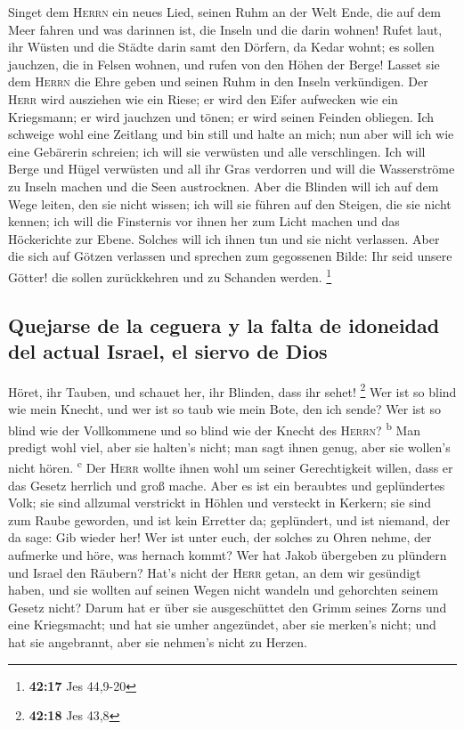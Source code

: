  Singet dem \textsc{Herrn} ein neues Lied, seinen Ruhm an
der Welt Ende, die auf dem Meer fahren und was darinnen ist, die Inseln
und die darin wohnen!  Rufet laut, ihr Wüsten und die
Städte darin samt den Dörfern, da Kedar wohnt; es sollen jauchzen, die
in Felsen wohnen, und rufen von den Höhen der Berge! 
Lasset sie dem \textsc{Herrn} die Ehre geben und seinen Ruhm in den
Inseln verkündigen.  Der \textsc{Herr} wird ausziehen wie
ein Riese; er wird den Eifer aufwecken wie ein Kriegsmann; er wird
jauchzen und tönen; er wird seinen Feinden obliegen.  Ich
schweige wohl eine Zeitlang und bin still und halte an mich; nun aber
will ich wie eine Gebärerin schreien; ich will sie verwüsten und alle
verschlingen.  Ich will Berge und Hügel verwüsten und all
ihr Gras verdorren und will die Wasserströme zu Inseln machen und die
Seen austrocknen.  Aber die Blinden will ich auf dem Wege
leiten, den sie nicht wissen; ich will sie führen auf den Steigen, die
sie nicht kennen; ich will die Finsternis vor ihnen her zum Licht machen
und das Höckerichte zur Ebene. Solches will ich ihnen tun und sie nicht
verlassen.  Aber die sich auf Götzen verlassen und
sprechen zum gegossenen Bilde: Ihr seid unsere Götter! die sollen
zurückkehren und zu Schanden werden. \footnote{\textbf{42:17} Jes
  44,9-20}

\hypertarget{quejarse-de-la-ceguera-y-la-falta-de-idoneidad-del-actual-israel-el-siervo-de-dios}{%
\subsection{Quejarse de la ceguera y la falta de idoneidad del actual
Israel, el siervo de
Dios}\label{quejarse-de-la-ceguera-y-la-falta-de-idoneidad-del-actual-israel-el-siervo-de-dios}}

 Höret, ihr Tauben, und schauet her, ihr Blinden, dass
ihr sehet! \footnote{\textbf{42:18} Jes 43,8}  Wer ist so
blind wie mein Knecht, und wer ist so taub wie mein Bote, den ich sende?
Wer ist so blind wie der Vollkommene und so blind wie der Knecht des
\textsc{Herrn}? \textsuperscript{b}  Man predigt wohl
viel, aber sie halten's nicht; man sagt ihnen genug, aber sie wollen's
nicht hören. \textsuperscript{c}  Der \textsc{Herr}
wollte ihnen wohl um seiner Gerechtigkeit willen, dass er das Gesetz
herrlich und groß mache.  Aber es ist ein beraubtes und
geplündertes Volk; sie sind allzumal verstrickt in Höhlen und versteckt
in Kerkern; sie sind zum Raube geworden, und ist kein Erretter da;
geplündert, und ist niemand, der da sage: Gib wieder her!
 Wer ist unter euch, der solches zu Ohren nehme, der
aufmerke und höre, was hernach kommt?  Wer hat Jakob
übergeben zu plündern und Israel den Räubern? Hat's nicht der
\textsc{Herr} getan, an dem wir gesündigt haben, und sie wollten auf
seinen Wegen nicht wandeln und gehorchten seinem Gesetz nicht?
 Darum hat er über sie ausgeschüttet den Grimm seines
Zorns und eine Kriegsmacht; und hat sie umher angezündet, aber sie
merken's nicht; und hat sie angebrannt, aber sie nehmen's nicht zu
Herzen.

